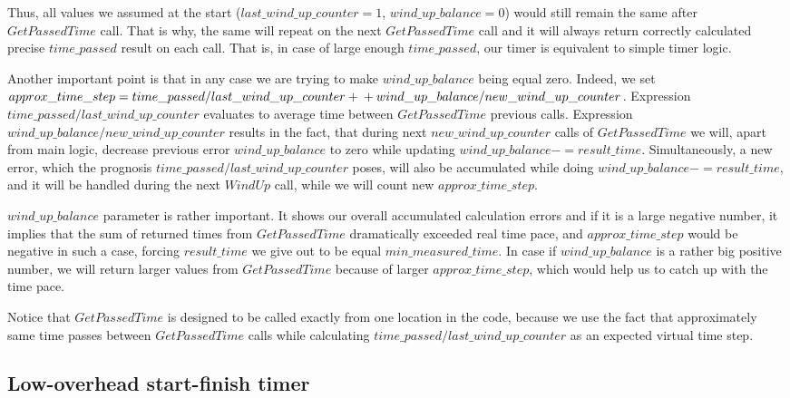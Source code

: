 \documentclass{article}
\begin{document}
Thus, all values we assumed at the start ($last\_wind\_up\_counter = 1$, $wind\_up\_balance = 0$) would still remain the same after $GetPassedTime$ call. That is why, the same will repeat on the next $GetPassedTime$ call and it will always return correctly calculated precise $time\_passed$ result on each call. That is, in case of large enough $time\_passed$, our timer is equivalent to simple timer logic.

Another important point is that in any case we are trying to make $wind\_up\_balance$ being equal zero. Indeed, we set $approx\_time\_step = time\_passed / last\_wind\_up\_counter +\\+ wind\_up\_balance / new\_wind\_up\_counter$. Expression $time\_passed / last\_wind\_up\_counter$ evaluates to average time between $GetPassedTime$ previous calls. Expression \\$wind\_up\_balance / new\_wind\_up\_counter$ results in the fact, that during next $new\_wind\_up\_counter$ calls of $GetPassedTime$ we will, apart from main logic, decrease previous error $wind\_up\_balance$ to zero while updating $wind\_up\_balance -= result\_time$. Simultaneously, a new error, which the prognosis $time\_passed / last\_wind\_up\_counter$ poses, will also be accumulated while doing $wind\_up\_balance -= result\_time$, and it will be handled during the next $WindUp$ call, while we will count new $approx\_time\_step$.

$wind\_up\_balance$ parameter is rather important. It shows our overall accumulated calculation errors and if it is a large negative number, it implies that the sum of returned times from $GetPassedTime$ dramatically exceeded real time pace, and $approx\_time\_step$ would be negative in such a case, forcing $result\_time$ we give out to be equal $min\_measured\_time$. In case if $wind\_up\_balance$ is a rather big positive number, we will return larger values from $GetPassedTime$ because of larger $approx\_time\_step$, which would help us to catch up with the time pace.

Notice that $GetPassedTime$ is designed to be called exactly from one location in the code, because we use the fact that approximately same time passes between $GetPassedTime$ calls while calculating $time\_passed / last\_wind\_up\_counter$ as an expected virtual time step.

\subsection{Low-overhead start-finish timer}
\label{subsec:low_overhead_start_finish_timer}
\end{document}
